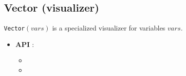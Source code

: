 \subsection{Vector (visualizer)}\label{vector:visu}\hypertarget{vector:visu}{}
\begin{notedef}
  \texttt{Vector}$(vars)$ is a specialized visualizer for variables $vars$.
\end{notedef}

\begin{itemize}
	\item \textbf{API} : 
	\begin{itemize}
	\item {}
	\item {}
	\end{itemize}
\end{itemize}

%


